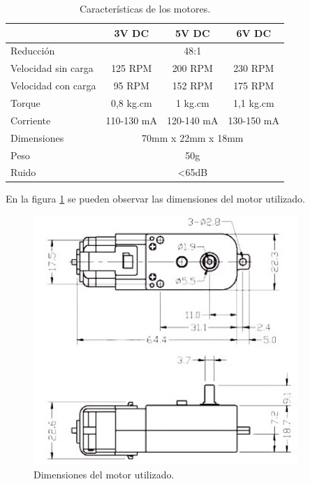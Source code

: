 \begin{table}[htpb]
\centering
\caption[características]{Características de los motores.}
\begin{tabular}{lccc}
                    & 3V DC       & 5V DC       & 6V DC      \\ \hline
Reducción           & \multicolumn{3}{c}{48:1}               \\
Velocidad sin carga & 125 RPM     & 200 RPM     & 230 RPM    \\
Velocidad con carga & 95 RPM      & 152 RPM     & 175 RPM    \\
Torque              & 0,8 kg.cm   & 1 kg.cm     & 1,1 kg.cm  \\
Corriente           & 110-130 mA  & 120-140 mA  & 130-150 mA \\
Dimensiones         & \multicolumn{3}{c}{70mm x 22mm x 18mm} \\
Peso                & \multicolumn{3}{c}{50g}                \\
Ruido               & \multicolumn{3}{c}{\textless{}65dB} 		\\  \hline
\end{tabular}
\label{tab:caracteristicas}
\end{table}


En la figura \ref{fig:planomoto} se pueden observar las dimensiones del motor utilizado.

%
\pagebreak

\begin{figure}[h]
	\centering
	\includegraphics[width=10cm]{./Figures/planomoto.jpg}
	\caption{Dimensiones del motor utilizado\protect\footnotemark.}
	\label{fig:planomoto}
\end{figure}

